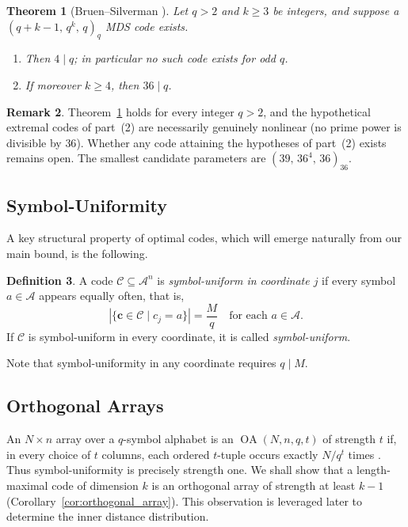 \documentclass[12pt, letterpaper]{article}
\theoremstyle{plain}
\newtheorem{theorem}{Theorem}[section]
\theoremstyle{definition}
\newtheorem{definition}[theorem]{Definition}
\newtheorem{remark}[theorem]{Remark}
\newcommand{\A}{{\mathcal{A}}}
\begin{document}
	\begin{theorem}[Bruen--Silverman {\cite[Theorems~4 and~6]{BruenSilverman1983}}]
		\label{thm:bruen_silverman}
		Let $q > 2$ and $k \ge 3$ be integers, and suppose a $(q+k-1,\, q^k,\, q)_q$ MDS code exists.
		\begin{enumerate}
			\item Then $4 \mid q$; in particular no such code exists for odd $q$.
			\item If moreover $k \ge 4$, then $36 \mid q$.
		\end{enumerate}
	\end{theorem}

	\begin{remark}\label{rem:bs_nonlinear}
		Theorem~\ref{thm:bruen_silverman} holds for every integer $q > 2$, and the hypothetical extremal codes of part~(2) are necessarily genuinely 	nonlinear (no prime power is divisible by $36$). Whether any code attaining the hypotheses of part~(2) exists remains open. The smallest candidate parameters are $(39,\,36^4,\,36)_{36}$.
	\end{remark}

	\subsection{Symbol-Uniformity}
	
	A key structural property of optimal codes, which will emerge naturally from our main bound, is the following.
	
	\begin{definition}
		A code $\mathcal{C} \subseteq \A^n$ is \emph{symbol-uniform in 	coordinate $j$} if every symbol $a \in \A$ appears equally often, that is,
		\[
		|\{ \mathbf{c} \in \mathcal{C} \mid c_j = a \}| = \frac{M}{q}
		\quad \text{for each } a \in \A.
		\]
		If $\mathcal{C}$ is symbol-uniform in every coordinate, it is called \emph{symbol-uniform}.
	\end{definition}
	
	Note that symbol-uniformity in any coordinate requires $q \mid M$.

	\subsection{Orthogonal Arrays}

	An $N\times n$ array over a $q$-symbol alphabet is an $\operatorname{OA}(N,n,q,t)$ of strength $t$ if, in every choice of $t$ columns, each ordered $t$-tuple occurs exactly $N/q^t$ times \cite{HedayatSloaneStufken1999}. Thus symbol-uniformity is precisely strength one. We shall show that a length-maximal code of dimension $k$ is an orthogonal array of strength at least $k-1$ (Corollary~\ref{cor:orthogonal_array}). This observation
	is leveraged later to determine the inner distance distribution.
\end{document}
